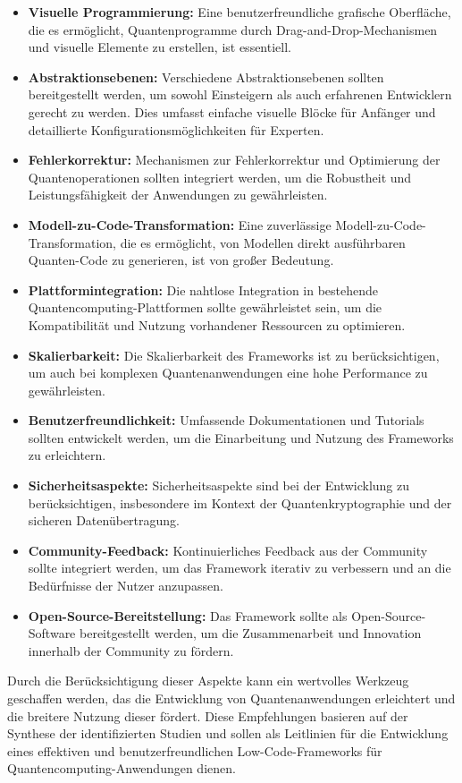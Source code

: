 \begin{itemize}
    \item \textbf{Visuelle Programmierung:} Eine benutzerfreundliche grafische Oberfläche, die es ermöglicht, Quantenprogramme 
    durch Drag-and-Drop-Mechanismen und visuelle Elemente zu erstellen, ist essentiell.
    \item \textbf{Abstraktionsebenen:} Verschiedene Abstraktionsebenen sollten bereitgestellt werden, um sowohl Einsteigern 
    als auch erfahrenen Entwicklern gerecht zu werden. Dies umfasst einfache visuelle Blöcke für Anfänger und detaillierte Konfigurationsmöglichkeiten für Experten.
    \item \textbf{Fehlerkorrektur:} Mechanismen zur Fehlerkorrektur und Optimierung der Quantenoperationen sollten integriert 
    werden, um die Robustheit und Leistungsfähigkeit der Anwendungen zu gewährleisten.
    \item \textbf{Modell-zu-Code-Transformation:} Eine zuverlässige Modell-zu-Code-Transformation, die es ermöglicht, von Modellen 
    direkt ausführbaren Quanten-Code zu generieren, ist von großer Bedeutung.
    \item \textbf{Plattformintegration:} Die nahtlose Integration in bestehende Quantencomputing-Plattformen sollte gewährleistet 
    sein, um die Kompatibilität und Nutzung vorhandener Ressourcen zu optimieren.
    \item \textbf{Skalierbarkeit:} Die Skalierbarkeit des Frameworks ist zu berücksichtigen, um auch bei komplexen Quantenanwendungen 
    eine hohe Performance zu gewährleisten.
    \item \textbf{Benutzerfreundlichkeit:} Umfassende Dokumentationen und Tutorials sollten entwickelt werden, um die Einarbeitung und 
    Nutzung des Frameworks zu erleichtern.
    \item \textbf{Sicherheitsaspekte:} Sicherheitsaspekte sind bei der Entwicklung zu berücksichtigen, insbesondere im Kontext der 
    Quantenkryptographie und der sicheren Datenübertragung.
    \item \textbf{Community-Feedback:} Kontinuierliches Feedback aus der Community sollte integriert werden, um das Framework iterativ 
    zu verbessern und an die Bedürfnisse der Nutzer anzupassen.
    \item \textbf{Open-Source-Bereitstellung:} Das Framework sollte als Open-Source-Software bereitgestellt werden, um die 
    Zusammenarbeit und Innovation innerhalb der Community zu fördern.
\end{itemize}

Durch die Berücksichtigung dieser Aspekte kann ein wertvolles Werkzeug geschaffen werden, das die Entwicklung von Quantenanwendungen 
erleichtert und die breitere Nutzung dieser fördert. Diese Empfehlungen basieren auf der Synthese der 
identifizierten Studien und sollen als Leitlinien für die Entwicklung eines effektiven und benutzerfreundlichen Low-Code-Frameworks 
für Quantencomputing-Anwendungen dienen. 